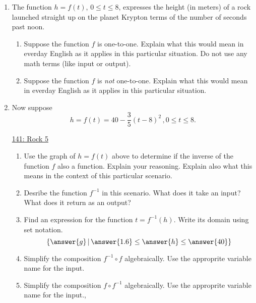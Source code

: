 \documentclass{ximera}
\begin{document}
\begin{exercise} \label{Eds5567y7y6644}
\begin{enumerate}
\item The function $h=f(t)$, $0\leq t \leq 8$, expresses the height (in meters) of a rock launched straight up on the planet Krypton terms of the number of seconds past noon. 

\begin{enumerate}
\item Suppose the function $f$ is one-to-one. Explain what this would mean in everday English as it applies in this particular situation. Do not use any math terms (like input or output).

\item Suppose the function $f$ is \emph{not} one-to-one. Explain what this would mean in everday English as it applies in this particular situation. %

\end{enumerate}

\item Now suppose 
\[
     h = f(t) = 40 - \frac{3}{5}(t-8)^2 \, , 0\leq t \leq 8 .
\]

\begin{onlineOnly}
    \begin{center}
\end{center}
\end{onlineOnly}

\href{https://www.desmos.com/calculator/medroshqo6}{141: Rock 5}

\begin{enumerate}
\item Use the graph of $h=f(t)$ above to determine if the inverse of the function $f$ also a function. Explain your reasoning. Explain also what this means in the context of this particular scenario.

\item Desribe the function $f^{-1}$ in this scenario. What does it take an input? What does it return as an output?

\item Find an expression for the function $t = f^{-1}(h)$. Write its domain using set notation.
\[
      \{ \answer{g} \, | \, \answer{1.6} \leq \answer{h} \leq \answer{40} \}
\]

\item Simplify the composition $f^{-1}\circ f$ algebraically. Use the approprite variable name for the input.

\item  Simplify the composition $f\circ f^{-1}$ algebraically. Use the approprite variable name for the input.,

\end{enumerate}

\end{enumerate}

\end{exercise}
\end{document}
